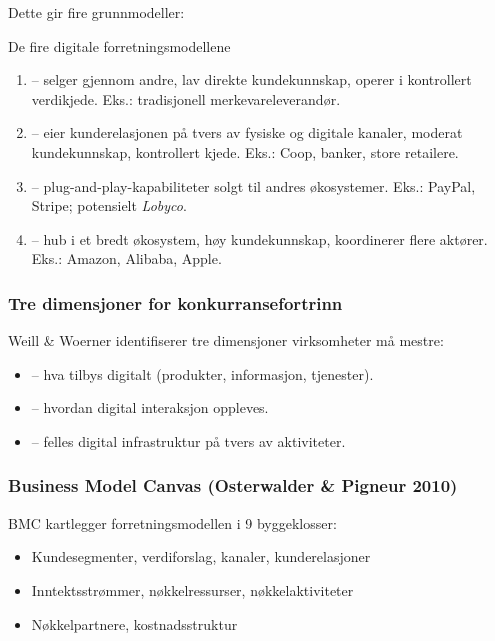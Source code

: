 Dette gir fire grunnmodeller:

\begin{definition}{De fire digitale forretningsmodellene}
\begin{enumerate}
  \item {} -- selger gjennom andre, lav direkte kundekunnskap,
    operer i kontrollert verdikjede. Eks.: tradisjonell merkevareleverandør.
  \item {} -- eier kunderelasjonen på tvers av
    fysiske og digitale kanaler, moderat kundekunnskap, kontrollert kjede.
    Eks.: Coop, banker, store retailere.
  \item {} -- plug-and-play-kapabiliteter solgt til
    andres økosystemer. Eks.: PayPal, Stripe; potensielt \emph{Lobyco}.
  \item {} -- hub i et bredt økosystem, høy
    kundekunnskap, koordinerer flere aktører. Eks.: Amazon, Alibaba, Apple.
\end{enumerate}
\end{definition}

\subsubsection*{Tre dimensjoner for konkurransefortrinn}
Weill \& Woerner identifiserer tre dimensjoner virksomheter må mestre:
\begin{itemize}
  \item {} -- hva tilbys digitalt (produkter, informasjon, tjenester).
  \item {} -- hvordan digital interaksjon oppleves.
  \item {} -- felles digital infrastruktur på tvers av aktiviteter.
\end{itemize}

\subsubsection*{Business Model Canvas (Osterwalder \& Pigneur 2010)}
BMC kartlegger forretningsmodellen i 9 byggeklosser:
\begin{itemize}
  \item Kundesegmenter, verdiforslag, kanaler, kunderelasjoner
  \item Inntektsstrømmer, nøkkelressurser, nøkkelaktiviteter
  \item Nøkkelpartnere, kostnadsstruktur
\end{itemize}

